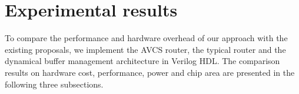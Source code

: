 \documentclass[10pt,conference]{IEEEtran}
\begin{document}
\section{Experimental results}\label{experiemnts}
To compare the performance and hardware overhead of our approach with the existing proposals, we implement the AVCS router, the typical router \cite{DaTo01} and the dynamical buffer management architecture \cite{4555894} in Verilog HDL. The comparison results on hardware cost, performance, power and chip area are presented in the following three subsections.

\end{document}
